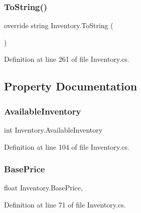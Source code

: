 \subsubsection{\texorpdfstring{To\+String()}{ToString()}}
{\footnotesize\ttfamily override string Inventory.\+To\+String (\begin{DoxyParamCaption}{ }\end{DoxyParamCaption})}



Definition at line 261 of file Inventory.\+cs.



\subsection{Property Documentation}
\mbox{\label{class_inventory_a5d26eb9165bd777a9d3f6e7428bd1047}} 
\subsubsection{\texorpdfstring{Available\+Inventory}{AvailableInventory}}
{\footnotesize\ttfamily int Inventory.\+Available\+Inventory\hspace{0.3cm}{\ttfamily [get]}}



Definition at line 104 of file Inventory.\+cs.

\mbox{\label{class_inventory_a3e9cedba92d689d70d765f25ca7f7830}} 
\subsubsection{\texorpdfstring{Base\+Price}{BasePrice}}
{\footnotesize\ttfamily float Inventory.\+Base\+Price\hspace{0.3cm}{\ttfamily [get]}, {\ttfamily [set]}}



Definition at line 71 of file Inventory.\+cs.

\mbox{\label{class_inventory_aafba8da2a679ce42d351fd071de24295}} 
